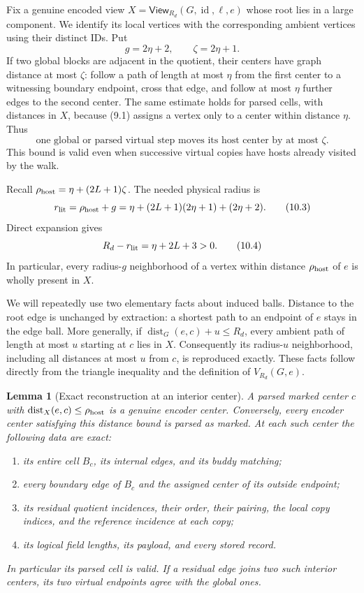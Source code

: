 \documentclass[11pt]{article}
\newtheorem{lemma}[theorem]{Lemma}
\theoremstyle{definition}
\theoremstyle{remark}
\newcommand{\id}{\operatorname{id}}
\newcommand{\dist}{\operatorname{dist}}
\begin{document}
Fix a genuine encoded view $X=\mathsf{View}_{R_d}(G,\id,\ell,e)$ whose
root lies in a large component.  We identify its local vertices with the
corresponding ambient vertices using their distinct IDs.  Put
\[
 g=2\eta+2,\qquad \zeta=2\eta+1.                                  \tag{10.1}
\]
If two global blocks are adjacent in the quotient, their centers
have graph distance at most $\zeta$: follow a path of length at most $\eta$
from the first center to a witnessing boundary endpoint, cross that edge,
and follow at most $\eta$ further edges to the second center.  The same
estimate holds for parsed cells, with distances in $X$, because (9.1)
assigns a vertex only to a center within distance $\eta$.  Thus
\[
 \text{one global or parsed virtual step moves its host center
 by at most }\zeta.                                               \tag{10.2}
\]
This bound is valid even when successive virtual copies have hosts already
visited by the walk.

Recall $\rho_{\rm host}=\eta+(2L+1)\zeta$.  The needed physical radius is
\[
 r_{\rm lit}=\rho_{\rm host}+g
   =\eta+(2L+1)(2\eta+1)+(2\eta+2).                            \tag{10.3}
\]
Direct expansion gives
\[
 R_d-r_{\rm lit}=\eta+2L+3>0.                                 \tag{10.4}
\]
In particular, every radius-$g$ neighborhood of a vertex within distance
$\rho_{\rm host}$ of $e$ is wholly present in $X$.

We will repeatedly use two elementary facts about induced balls.  Distance
to the root edge is unchanged by extraction: a shortest path to an endpoint
of $e$ stays in the edge ball.  More generally, if
$\dist_G(e,c)+u\le R_d$, every ambient path of length at most $u$ starting
at $c$ lies in $X$.  Consequently its radius-$u$ neighborhood, including
all distances at most $u$ from $c$, is reproduced exactly.  These facts
follow directly from the triangle inequality and the definition of
$V_{R_d}(G,e)$.

\begin{lemma}[Exact reconstruction at an interior center]
\label{lem:interior-reconstruction}
A parsed marked center $c$ with $\dist_X(e,c)\le\rho_{\rm host}$ is a
genuine encoder center.  Conversely, every encoder center satisfying this
distance bound is parsed as marked.  At each such center the following
data are exact:
\begin{enumerate}[label=\textup{(\roman*)}]
\item its entire cell $B_c$, its internal edges, and its buddy matching;
\item every boundary edge of $B_c$ and the assigned center of its outside
      endpoint;
\item its residual quotient incidences, their order, their pairing,
      the local copy indices, and the reference incidence at each copy;
\item its logical field lengths, its payload, and every stored record.
\end{enumerate}
In particular its parsed cell is valid.  If a residual edge joins two
such interior centers, its two virtual endpoints agree with the global
ones.
\end{lemma}
\end{document}
